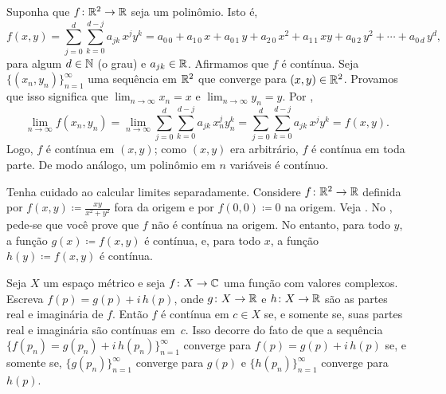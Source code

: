 \begin{example}
Suponha que $f \colon {\mathbb{R}}^2 \to {\mathbb{R}}$ seja um polinômio. Isto é,
\begin{equation*}
f(x,y) =
\sum_{j=0}^d
\sum_{k=0}^{d-j}
a_{jk}\,x^jy^k =
a_{0\,0} + a_{1\,0} \, x +
a_{0\,1} \, y+  
a_{2\,0} \, x^2+  
a_{1\,1} \, xy+  
a_{0\,2} \, y^2+ \cdots +
a_{0\,d} \, y^d ,
\end{equation*}
para algum $d \in {\mathbb{N}}$ (o grau) e $a_{jk} \in {\mathbb{R}}$. Afirmamos que
$f$ é contínua. Seja $\bigl\{ (x_n,y_n) \bigr\}_{n=1}^\infty$ uma sequência
em ${\mathbb{R}}^2$ que converge para $(x,y) \in {\mathbb{R}}^2$. Provamos que isso
significa que $\lim_{n\to\infty} x_n = x$ e $\lim_{n\to\infty} y_n = y$.
Por ,
\begin{equation*}
\lim_{n\to\infty}
f(x_n,y_n) =
\lim_{n\to\infty}
\sum_{j=0}^d
\sum_{k=0}^{d-j}
a_{jk} \, x_n^jy_n^k 
=
\sum_{j=0}^d
\sum_{k=0}^{d-j}
a_{jk} \, x^jy^k
=
f(x,y) .
\end{equation*}
Logo, $f$ é contínua em $(x,y)$; como $(x,y)$ era arbitrário, $f$ é
contínua em toda parte. De modo análogo, um
polinômio em $n$ variáveis é contínuo.
\end{example}

Tenha cuidado ao calcular limites separadamente.
Considere $f \colon {\mathbb{R}}^2 \to {\mathbb{R}}$ definida por $f(x,y) \coloneqq \frac{xy}{x^2+y^2}$
fora da origem e por $f(0,0) \coloneqq 0$ na origem.
Veja .
No ,
pede-se que você prove que $f$ não é contínua na origem.
No entanto, para todo $y$, a função $g(x) \coloneqq f(x,y)$ é
contínua,
e, para todo $x$, a função $h(y) \coloneqq f(x,y)$ é contínua.
\begin{myfigureht}
\caption{Gráfico de $\frac{xy}{x^2+y^2}$.\label{fig:xyxsqysq}}
\end{myfigureht}

\begin{example}
Seja $X$ um espaço métrico e seja $f \colon X \to {\mathbb{C}}$ uma função com valores
complexos. Escreva $f(p) = g(p) + i \, h(p)$, onde $g \colon X \to {\mathbb{R}}$
e $h \colon X \to {\mathbb{R}}$ são as partes real e imaginária de $f$.
Então $f$ é contínua em $c \in X$ se, e somente se, suas partes real
e imaginária são contínuas em~$c$.  
Isso decorre do fato de que a sequência $\bigl\{ f(p_n) = g(p_n) + i \, h(p_n) \bigr\}_{n=1}^\infty$
converge para $f(p) = g(p) + i \, h(p)$ se, e somente se,
$\bigl\{ g(p_n) \bigr\}_{n=1}^\infty$ converge para $g(p)$ e
$\bigl\{ h(p_n) \bigr\}_{n=1}^\infty$ converge para $h(p)$.
\end{example}

